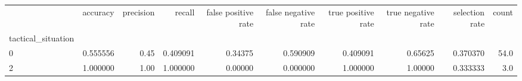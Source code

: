 \begin{tabular}{lrrrrrrrrr}
\toprule
{} &  accuracy &  precision &    recall &  false positive rate &  false negative rate &  true positive rate &  true negative rate &  selection rate &  count \\
tactical\_situation &           &            &           &                      &                      &                     &                     &                 &        \\
\midrule
0                  &  0.555556 &       0.45 &  0.409091 &              0.34375 &             0.590909 &            0.409091 &             0.65625 &        0.370370 &   54.0 \\
2                  &  1.000000 &       1.00 &  1.000000 &              0.00000 &             0.000000 &            1.000000 &             1.00000 &        0.333333 &    3.0 \\
\bottomrule
\end{tabular}
